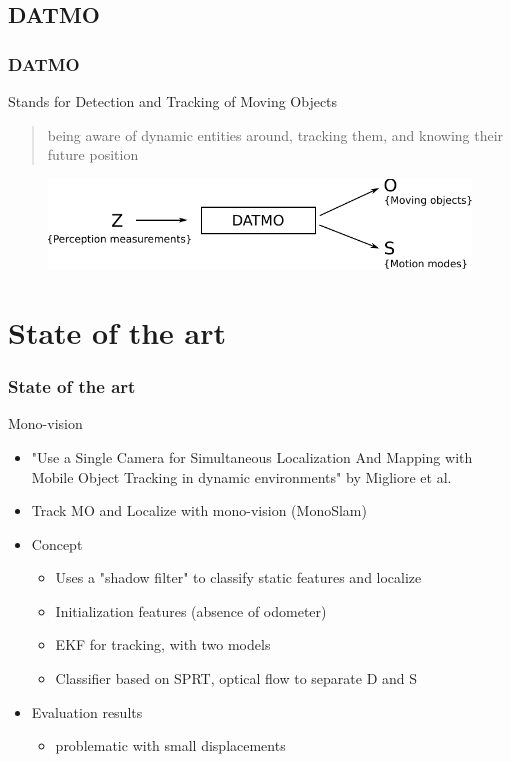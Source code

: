 \documentclass{beamer}
\begin{document}
	\subsection{DATMO}
		\begin{frame}
			\frametitle{DATMO}
			\begin{block}{Stands for}				
				Detection and Tracking of Moving Objects
			\end{block}
			\begin{quotation}
				being aware of dynamic entities around, tracking them, and knowing their future position\cite{DBLP:journals/inffus/VuBA11}
			\end{quotation}				
			\begin{figure}[h]
				\center
				\includegraphics[scale=0.8]{../img/fig:datmo:process}
			 \end{figure}		
		\end{frame}


\section{State of the art}

	\begin{frame}
		\frametitle{State of the art}
		
		\begin{block}{Mono-vision}
			\begin{itemize}
			\item "Use a Single Camera for Simultaneous Localization And Mapping with  Mobile Object Tracking in dynamic environments" by Migliore et al.
			\item Track MO and Localize with mono-vision (MonoSlam)
			\item Concept
				\begin{itemize}			
				\item Uses a "shadow filter" to classify static features and localize
				\item Initialization features (absence of odometer)
				\item EKF for tracking, with two models
				\item Classifier based on SPRT, optical flow to separate D and S				
				\end{itemize}		
			\item Evaluation results
				\begin{itemize}			
				\item problematic with small displacements
				\end{itemize}	
			\end{itemize}		
		\end{block}
	\end{frame}
	
\end{document}
